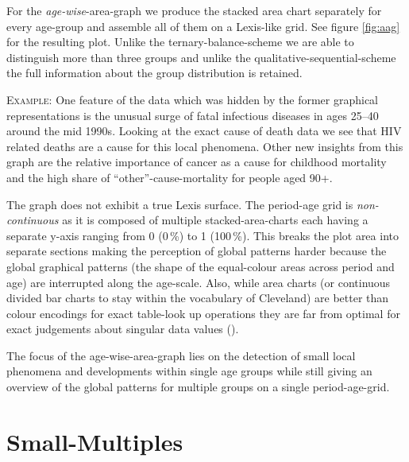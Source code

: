 \documentclass[a4paper, 12pt]{scrartcl}
\begin{document}
For the \emph{age-wise}-area-graph we produce the stacked area chart separately for every age-group and assemble all of them on a Lexis-like grid. See figure \ref{fig:aag} for the resulting plot. Unlike the ternary-balance-scheme we are able to distinguish more than three groups and unlike the qualitative-sequential-scheme the full information about the group distribution is retained.

\textsc{Example:} One feature of the data which was hidden by the former graphical representations is the unusual surge of fatal infectious diseases in ages 25--40 around the mid 1990s. Looking at the exact cause of death data we see that HIV related deaths are a cause for this local phenomena. Other new insights from this graph are the relative importance of cancer as a cause for childhood mortality and the high share of \enquote{other}-cause-mortality for people aged 90+.

The graph does not exhibit a true Lexis surface. The period-age grid is \emph{non-continuous} as it is composed of multiple stacked-area-charts each having a separate y-axis ranging from 0 (0\,\%) to 1 (100\,\%). This breaks the plot area into separate sections making the perception of global patterns harder because the global graphical patterns (the shape of the equal-colour areas across period and age) are interrupted along the age-scale. Also, while area charts (or continuous divided bar charts to stay within the vocabulary of Cleveland) are better than colour encodings for exact table-look up operations they are far from optimal for exact judgements about singular data values (\cite{Cleveland1994}).

The focus of the age-wise-area-graph lies on the detection of small local phenomena and developments within single age groups while still giving an overview of the global patterns for multiple groups on a single period-age-grid.

\clearpage

\section{Small-Multiples} %
\label{sec:sm}
\end{document}
